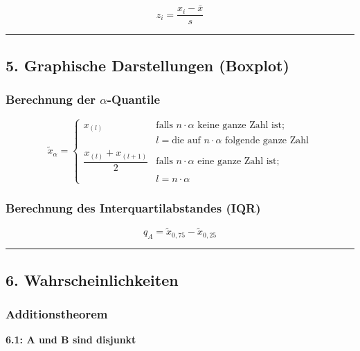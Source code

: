 \documentclass[
]{article}
\begin{document}
\[z_i = \frac{x_i - \bar{x}}{s}\]

\begin{center}\rule{0.5\linewidth}{0.5pt}\end{center}

\subsection{5. Graphische Darstellungen
(Boxplot)}\label{graphische-darstellungen-boxplot}

\subsubsection{\texorpdfstring{Berechnung der
\(\alpha\)-Quantile}{Berechnung der \textbackslash alpha-Quantile}}\label{berechnung-der-alpha-quantile}

\[
\tilde{x}_\alpha =
\begin{cases}
x_{(l)} & \text{falls } n \cdot \alpha \text{ keine ganze Zahl ist;} \\
& l = \text{die auf } n \cdot \alpha \text{ folgende ganze Zahl} \\[6pt]
\dfrac{x_{(l)} + x_{(l+1)}}{2} & \text{falls } n \cdot \alpha \text{ eine ganze Zahl ist;} \\
& l = n \cdot \alpha
\end{cases}
\]

\subsubsection{Berechnung des Interquartilabstandes
(IQR)}\label{berechnung-des-interquartilabstandes-iqr}

\[q_A = \tilde{x}_{0{,}75} - \tilde{x}_{0{,}25}\]

\begin{center}\rule{0.5\linewidth}{0.5pt}\end{center}

\subsection{6. Wahrscheinlichkeiten}\label{wahrscheinlichkeiten}

\subsubsection{Additionstheorem}\label{additionstheorem}

\textbf{6.1: A und B sind disjunkt}
\end{document}
